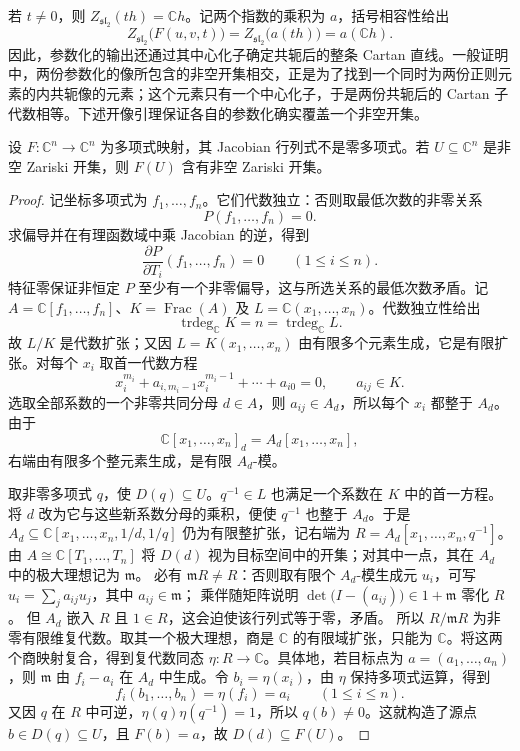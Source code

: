 \ProseParagraphBreak

若 \(t\ne0\)，则 \(Z_{\mathfrak{sl}_2}(th)=\mathbb Ch\)。记两个指数的乘积为 \(a\)，括号相容性给出
\[
	Z_{\mathfrak{sl}_2}\bigl(F(u,v,t)\bigr) =Z_{\mathfrak{sl}_2}\bigl(a(th)\bigr) =a(\mathbb Ch).
\]
因此，参数化的输出还通过其中心化子确定共轭后的整条 Cartan 直线。一般证明中，两份参数化的像所包含的非空开集相交，正是为了找到一个同时为两份正则元素的内共轭像的元素；这个元素只有一个中心化子，于是两份共轭后的 Cartan 子代数相等。下述开像引理保证各自的参数化确实覆盖一个非空开集。

\begin{lemma}\label{b5:lem:polynomial-open-image}
	设 \(F:\mathbb C^n\to\mathbb C^n\) 为多项式映射，其 Jacobian 行列式不是零多项式。若 \(U\subseteq\mathbb C^n\) 是非空 Zariski 开集，则 \(F(U)\) 含有非空 Zariski 开集。
\end{lemma}
\begin{proof}
	记坐标多项式为 \(f_1,\ldots,f_n\)。它们代数独立：否则取最低次数的非零关系
	\[
		P(f_1,\ldots,f_n)=0.
	\]
	求偏导并在有理函数域中乘 Jacobian 的逆，得到
	\[
		\frac{\partial P}{\partial T_i}(f_1,\ldots,f_n)=0 \qquad(1\le i\le n).
	\]
	特征零保证非恒定 \(P\) 至少有一个非零偏导，这与所选关系的最低次数矛盾。记 \(A=\mathbb C[f_1,\ldots,f_n]\)、\(K=\operatorname{Frac}(A)\) 及 \(L=\mathbb C(x_1,\ldots,x_n)\)。代数独立性给出
	\[
		\operatorname{trdeg}_{\mathbb C}K=n =\operatorname{trdeg}_{\mathbb C}L.
	\]
	故 \(L/K\) 是代数扩张；又因 \(L=K(x_1,\ldots,x_n)\) 由有限多个元素生成，它是有限扩张。对每个 \(x_i\) 取首一代数方程
	\[
		x_i^{m_i}+a_{i,m_i-1}x_i^{m_i-1}+\cdots+a_{i0}=0, \qquad a_{ij}\in K.
	\]
	选取全部系数的一个非零共同分母 \(d\in A\)，则 \(a_{ij}\in A_d\)，所以每个 \(x_i\) 都整于 \(A_d\)。由于
	\[
		\mathbb C[x_1,\ldots,x_n]_d=A_d[x_1,\ldots,x_n],
	\]
	右端由有限多个整元素生成，是有限 \(A_d\)-模。

	取非零多项式 \(q\)，使 \(D(q)\subseteq U\)。\(q^{-1}\in L\) 也满足一个系数在 \(K\) 中的首一方程。将 \(d\) 改为它与这些新系数分母的乘积，便使 \(q^{-1}\) 也整于 \(A_d\)。于是 \(A_d\subseteq\mathbb C[x_1,\ldots,x_n,1/d,1/q]\) 仍为有限整扩张，记右端为 \(R=A_d[x_1,\ldots,x_n,q^{-1}]\)。由 \(A\cong\mathbb C[T_1,\ldots,T_n]\) 将 \(D(d)\) 视为目标空间中的开集；对其中一点，其在 \(A_d\) 中的极大理想记为 \(\mathfrak m\)。 必有 \(\mathfrak mR\ne R\)：否则取有限个 \(A_d\)-模生成元 \(u_i\)，可写 \(u_i=\sum_j a_{ij}u_j\)，其中 \(a_{ij}\in\mathfrak m\)； 乘伴随矩阵说明 \(\det\bigl(I-(a_{ij})\bigr)\in1+\mathfrak m\) 零化 \(R\)。 但 \(A_d\) 嵌入 \(R\) 且 \(1\in R\)，这会迫使该行列式等于零，矛盾。 所以 \(R/\mathfrak mR\) 为非零有限维复代数。取其一个极大理想，商是 \(\mathbb C\) 的有限域扩张，只能为 \(\mathbb C\)。将这两个商映射复合，得到复代数同态 \(\eta:R\to\mathbb C\)。具体地，若目标点为 \(a=(a_1,\ldots,a_n)\)，则 \(\mathfrak m\) 由 \(f_i-a_i\) 在 \(A_d\) 中生成。令 \(b_i=\eta(x_i)\)，由 \(\eta\) 保持多项式运算，得到
	\[
		f_i(b_1,\ldots,b_n)=\eta(f_i)=a_i\qquad(1\leq i\leq n).
	\]
	又因 \(q\) 在 \(R\) 中可逆，\(\eta(q)\eta(q^{-1})=1\)，所以 \(q(b)\ne0\)。这就构造了源点 \(b\in D(q)\subseteq U\)，且 \(F(b)=a\)，故 \(D(d)\subseteq F(U)\)。
\end{proof}

